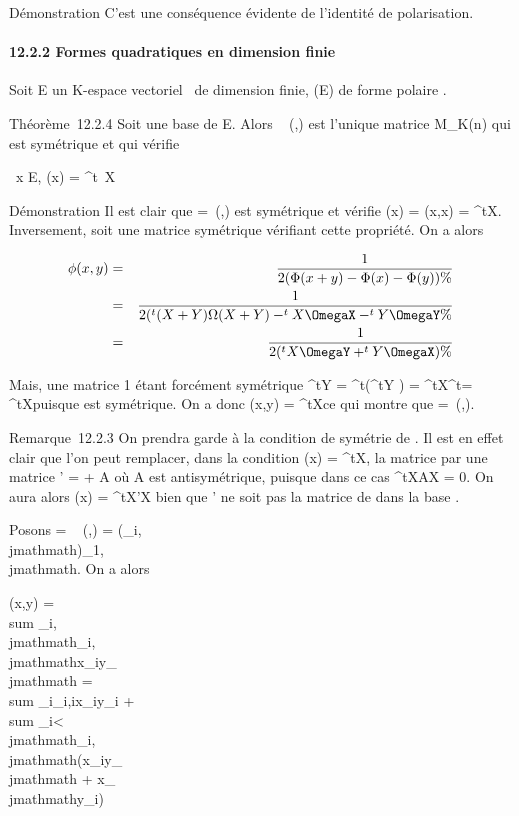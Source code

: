 \documentclass[]{article}
\begin{document}
Démonstration C'est une conséquence évidente de l'identité de
polarisation.

\paragraph{12.2.2 Formes quadratiques en dimension finie}

Soit E un K-espace vectoriel ~de dimension finie, \Phi \inQ(E) de forme
polaire \phi.

Théorème~12.2.4 Soit  une base de E. Alors
\mathrmMat~ (\phi,) est
l'unique matrice \Omega \in M_K(n) qui est symétrique et qui vérifie

\forall~x \in E, \Phi(x) = ^t~X\OmegaX

Démonstration Il est clair que \Omega =\
\mathrmMat (\Phi,) est symétrique et vérifie \Phi(x) =
\phi(x,x) = ^tX\OmegaX. Inversement, soit \Omega une matrice symétrique
vérifiant cette propriété. On a alors

\begin{align*} \phi(x,y)& =& 1 \over
2 (\Phi(x + y) - \Phi(x) - \Phi(y)) \%& \\ &
=& 1 \over 2 (^t(X + Y )\Omega(X + Y )
-^tX\OmegaX -^tY \OmegaY \%&
\\ & =& 1 \over 2
(^tX\OmegaY + ^tY \OmegaX) \%&
\\ \end{align*}

Mais, une matrice 1  étant forcément symétrique ^tY \OmegaX =
^t(^tY \OmegaX) = ^tX^t\OmegaY =
^tX\OmegaY puisque \Omega est symétrique. On a donc \phi(x,y) =
^tX\OmegaY ce qui montre que \Omega =\
\mathrmMat (\phi,).

Remarque~12.2.3 On prendra garde à la condition de symétrie de \Omega. Il est
en effet clair que l'on peut remplacer, dans la condition \Phi(x) =
^tX\OmegaX, la matrice \Omega par une matrice \Omega' = \Omega + A où A est
antisymétrique, puisque dans ce cas ^tXAX = 0. On aura alors
\Phi(x) = ^tX\Omega'X bien que \Omega' ne soit pas la matrice de \Phi dans la
base \mathcal{E}.

Posons \Omega = \mathrmMat~ (\phi,)
= (\omega_i,\\jmathmath)_1\leqi,\\jmathmath\leqn. On a alors

\phi(x,y) = \\sum
_i,\\jmathmath\omega_i,\\jmathmathx_iy_\\jmathmath =
\\sum
_i\omega_i,ix_iy_i +
\\sum
_i\textless{}\\jmathmath\omega_i,\\jmathmath(x_iy_\\jmathmath +
x_\\jmathmathy_i)
\end{document}

